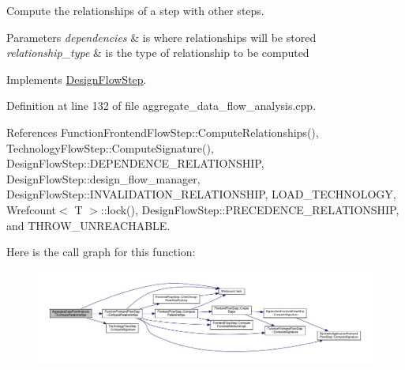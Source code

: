 Compute the relationships of a step with other steps. 


\begin{DoxyParams}{Parameters}
{\em dependencies} & is where relationships will be stored \\
\hline
{\em relationship\+\_\+type} & is the type of relationship to be computed \\
\hline
\end{DoxyParams}


Implements \hyperlink{classDesignFlowStep_a65bf7bcb603189a7ddcf930c3a9fd7fe}{Design\+Flow\+Step}.



Definition at line 132 of file aggregate\+\_\+data\+\_\+flow\+\_\+analysis.\+cpp.



References Function\+Frontend\+Flow\+Step\+::\+Compute\+Relationships(), Technology\+Flow\+Step\+::\+Compute\+Signature(), Design\+Flow\+Step\+::\+D\+E\+P\+E\+N\+D\+E\+N\+C\+E\+\_\+\+R\+E\+L\+A\+T\+I\+O\+N\+S\+H\+IP, Design\+Flow\+Step\+::design\+\_\+flow\+\_\+manager, Design\+Flow\+Step\+::\+I\+N\+V\+A\+L\+I\+D\+A\+T\+I\+O\+N\+\_\+\+R\+E\+L\+A\+T\+I\+O\+N\+S\+H\+IP, L\+O\+A\+D\+\_\+\+T\+E\+C\+H\+N\+O\+L\+O\+GY, Wrefcount$<$ T $>$\+::lock(), Design\+Flow\+Step\+::\+P\+R\+E\+C\+E\+D\+E\+N\+C\+E\+\_\+\+R\+E\+L\+A\+T\+I\+O\+N\+S\+H\+IP, and T\+H\+R\+O\+W\+\_\+\+U\+N\+R\+E\+A\+C\+H\+A\+B\+LE.

Here is the call graph for this function\+:
\nopagebreak
\begin{figure}[H]
\begin{center}
\leavevmode
\includegraphics[width=350pt]{da/d29/classAggregateDataFlowAnalysis_aa387e9bcfac9ad1ac7bab7b5b94f19fd_cgraph}
\end{center}
\end{figure}
\mbox{\label{classAggregateDataFlowAnalysis_a691e72b5bd3dc3ad14a003b89d242628}} 
